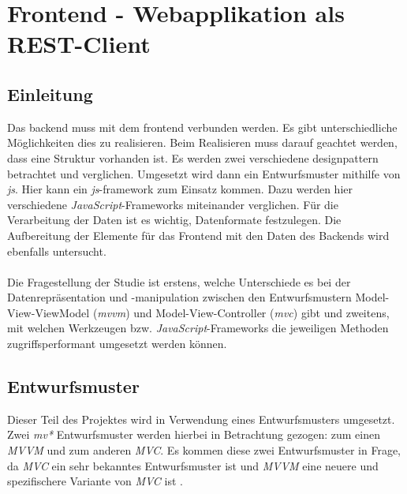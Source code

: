 
\section{Frontend - Webapplikation als REST-Client}
\label{chapter:study-datenschnittstelle}
\subsection{Einleitung}
Das \Gls{backend} muss mit dem \Gls{frontend} verbunden werden. Es gibt unterschiedliche Möglichkeiten dies zu realisieren. Beim Realisieren muss darauf geachtet werden, dass eine Struktur vorhanden ist. Es werden zwei verschiedene \Gls{designpattern} betrachtet und verglichen. Umgesetzt wird dann ein Entwurfsmuster mithilfe von \textit{\Gls{js}}. Hier kann ein \textit{\Gls{js}}-\Gls{framework} zum Einsatz kommen. Dazu werden hier verschiedene \textit{JavaScript}-Frameworks miteinander verglichen. Für die Verarbeitung der Daten ist es wichtig, Datenformate festzulegen. Die Aufbereitung der Elemente für das Frontend mit den Daten des Backends wird ebenfalls untersucht.
\\\\
Die Fragestellung der Studie ist erstens, welche Unterschiede es bei der Datenrepräsentation und -manipulation zwischen den Entwurfsmustern Model-View-ViewModel (\textit{\Gls{mvvm}}) und Model-View-Controller (\textit{\Gls{mvc}}) gibt und zweitens, mit welchen Werkzeugen bzw. \textit{JavaScript}-Frameworks die jeweiligen Methoden zugriffsperformant umgesetzt werden können.
\subsection{Entwurfsmuster}
Dieser Teil des Projektes wird in Verwendung eines Entwurfsmusters umgesetzt. Zwei \textit{\Gls{mv*}} Entwurfsmuster werden hierbei in Betrachtung gezogen: zum einen \textit{MVVM} und zum anderen \textit{MVC}. Es kommen diese zwei Entwurfsmuster in Frage, da \textit{MVC} ein sehr bekanntes Entwurfsmuster ist und \textit{MVVM} eine neuere und spezifischere Variante von \textit{MVC} ist \cite{mvvm_vue}.
